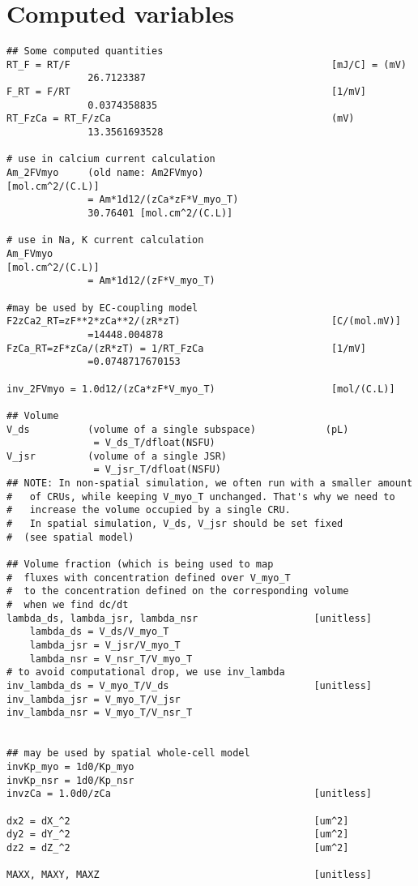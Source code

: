 
\section{Computed variables}
\label{sec:computed-variables}

\begin{verbatim}
## Some computed quantities
RT_F = RT/F                                             [mJ/C] = (mV)
              26.7123387
F_RT = F/RT                                             [1/mV]
              0.0374358835
RT_FzCa = RT_F/zCa                                      (mV)
              13.3561693528

# use in calcium current calculation
Am_2FVmyo     (old name: Am2FVmyo)                      [mol.cm^2/(C.L)]
              = Am*1d12/(zCa*zF*V_myo_T)
              30.76401 [mol.cm^2/(C.L)]

# use in Na, K current calculation
Am_FVmyo                                               [mol.cm^2/(C.L)]
              = Am*1d12/(zF*V_myo_T)

#may be used by EC-coupling model
F2zCa2_RT=zF**2*zCa**2/(zR*zT)                          [C/(mol.mV)]
              =14448.004878
FzCa_RT=zF*zCa/(zR*zT) = 1/RT_FzCa                      [1/mV]
              =0.0748717670153

inv_2FVmyo = 1.0d12/(zCa*zF*V_myo_T)                    [mol/(C.L)]

## Volume
V_ds          (volume of a single subspace)            (pL)
               = V_ds_T/dfloat(NSFU)
V_jsr         (volume of a single JSR)
               = V_jsr_T/dfloat(NSFU)
## NOTE: In non-spatial simulation, we often run with a smaller amount
#   of CRUs, while keeping V_myo_T unchanged. That's why we need to 
#   increase the volume occupied by a single CRU.
#   In spatial simulation, V_ds, V_jsr should be set fixed 
#  (see spatial model)

## Volume fraction (which is being used to map 
#  fluxes with concentration defined over V_myo_T
#  to the concentration defined on the corresponding volume
#  when we find dc/dt
lambda_ds, lambda_jsr, lambda_nsr                    [unitless]
    lambda_ds = V_ds/V_myo_T
    lambda_jsr = V_jsr/V_myo_T
    lambda_nsr = V_nsr_T/V_myo_T
# to avoid computational drop, we use inv_lambda
inv_lambda_ds = V_myo_T/V_ds                         [unitless]
inv_lambda_jsr = V_myo_T/V_jsr
inv_lambda_nsr = V_myo_T/V_nsr_T


## may be used by spatial whole-cell model
invKp_myo = 1d0/Kp_myo
invKp_nsr = 1d0/Kp_nsr
invzCa = 1.0d0/zCa                                   [unitless]

dx2 = dX_^2                                          [um^2]
dy2 = dY_^2                                          [um^2]
dz2 = dZ_^2                                          [um^2]

MAXX, MAXY, MAXZ                                     [unitless]
\end{verbatim}


